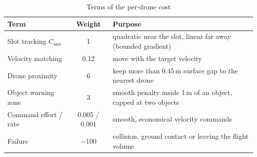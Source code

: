 \begin{table}[htbp]
\centering
\caption{Terms of the per-drone cost}
\label{tab:reward}
\small
\begin{tabularx}{\textwidth}{@{}lcX@{}}
\toprule
Term & Weight & Purpose\\
\midrule
Slot tracking $C_{\mathrm{slot}}$ & 1 & quadratic near the slot, linear far away (bounded gradient)\\
Velocity matching & 0.12 & move with the target velocity\\
Drone proximity & 6 & keep more than 0.45\,m surface gap to the nearest drone\\
Object warning zone & 3 & smooth penalty inside 1\,m of an object, capped at two objects\\
Command effort / rate & 0.005 / 0.001 & smooth, economical velocity commands\\
Failure & $-100$ & collision, ground contact or leaving the flight volume\\
\bottomrule
\end{tabularx}
\end{table}

